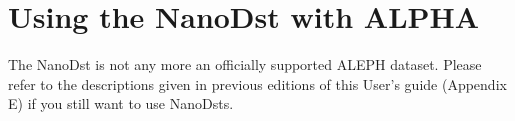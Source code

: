 \chapter{\label{sec-NANinf} Using the NanoDst with ALPHA}
 
The NanoDst is not any more an officially supported ALEPH dataset. 
Please refer to the descriptions given in previous editions of this User's guide
(Appendix E) if you still want to use NanoDsts.


\newpage
